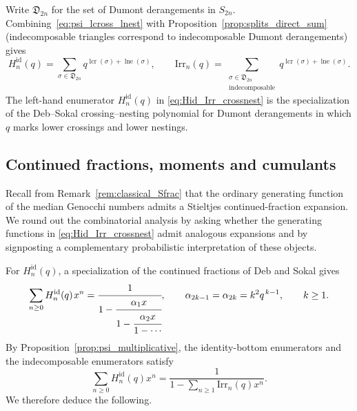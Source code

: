 \documentclass[10pt,a4paper]{amsart}
\numberwithin{equation}{section}
\newcommand{\ssp}{\hspace{1pt}}
\theoremstyle{definition}
\begin{document}
Write $\mathfrak{D}_{2n}$ for the set of Dumont derangements in $S_{2n}$.
Combining~\eqref{eq:psi_lcross_lnest} with Proposition~\ref{prop:splits_direct_sum}
(indecomposable triangles correspond to indecomposable Dumont
derangements) gives
\begin{equation}
	\label{eq:Hid_Irr_crossnest}
	H_n^{\mathrm{id}}(q)
	=\!\!\sum_{\sigma\in\mathfrak{D}_{2n}}\!\!
	q^{\operatorname{lcr}(\sigma)+\operatorname{lne}(\sigma)},
	\qquad
	\mathrm{Irr}_n(q)
	=\!\!\sum_{\substack{\sigma\in\mathfrak{D}_{2n}\\ \text{indecomposable}}}\!\!
	q^{\operatorname{lcr}(\sigma)+\operatorname{lne}(\sigma)}.
\end{equation}
The left-hand enumerator $H_n^{\mathrm{id}}(q)$ in
\eqref{eq:Hid_Irr_crossnest} is the specialization of the Deb--Sokal
crossing--nesting polynomial for Dumont derangements \cite{DebSokal2024} in
which $q$ marks lower crossings and lower nestings.

\subsection{Continued fractions, moments and cumulants}
\label{subsec:moments_cumulants}

Recall from Remark~\ref{rem:classical_Sfrac} that the ordinary generating
function of the median Genocchi numbers admits a Stieltjes
continued-fraction expansion. We round out the combinatorial analysis by asking whether the
generating functions in \eqref{eq:Hid_Irr_crossnest} admit analogous
expansions and by signposting a complementary probabilistic interpretation of these objects.

For $H_n^{\mathrm{id}}(q)$, a specialization of the continued
fractions of Deb and Sokal \cite{DebSokal2024} gives
\begin{equation}
  \sum_{n\geq0} H_n^{\mathrm{id}}(q)\ssp x^n
  =
  \cfrac{1}{1-\cfrac{\alpha_1x}
  {1-\cfrac{\alpha_2x}
  {1-\cdots}}},
  \qquad
  \alpha_{2k-1}=\alpha_{2k}=k^2q^{\ssp k-1},
  \qquad k\geq1 .
  \label{eq:Hid_Sfrac}
\end{equation}
By Proposition~\ref{prop:psi_multiplicative}, the identity-bottom enumerators
and the indecomposable enumerators satisfy
\begin{equation}
  \sum_{n\geq0}H_n^{\mathrm{id}}(q)x^n
  =
  \frac{1}{
    1-\sum_{n\geq1}\mathrm{Irr}_n(q)x^n
  }.
  \label{eq:boolean_first_return}
\end{equation}
We therefore deduce the following.
\end{document}
